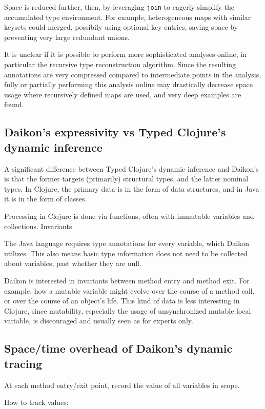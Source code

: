 \documentclass[10pt]{article}
\begin{document}
Space is reduced further, then, by leveraging \texttt{join} to eagerly simplify
the accumulated type environment. For example, heterogeneous maps with similar
keysets could merged, possibily using optional key entries, saving space by
preventing very large redundant unions.

It is unclear if it is possible to perform more sophisticated analyses online,
in particular the recursive type reconstruction algorithm. Since the resulting
annotations are very compressed compared to intermediate points in the analysis,
fully or partially performing this analysis online may drastically decrease space
usage where recursively defined maps are used, and very deep examples are found.

\subsection*{Daikon's expressivity vs Typed Clojure's dynamic inference}

A significant difference between Typed Clojure's dynamic inference and Daikon's
is that the former targets (primarily) structural types, and the latter
nominal types. In Clojure, the primary data is in the form of data structures,
and in Java it is in the form of classes.

Processing in Clojure is done via functions, often with immutable variables and collections.
Invariants 

The Java language requires type annotations for every variable, which Daikon utilizes.
This also means basic type information does not need to be collected about variables,
past whether they are null.

Daikon is interested in invariants between method entry and method exit. For example,
how a mutable variable might evolve over the course of a method call, or over the course
of an object's life. This kind of data is less interesting in Clojure, since mutability,
especially the usage of unsynchronized mutable local variable, is discouraged and usually
seen as for experts only.


\subsection*{Space/time overhead of Daikon's dynamic tracing}

At each method entry/exit point, record the value of all variables in scope.

How to track values:
\end{document}
